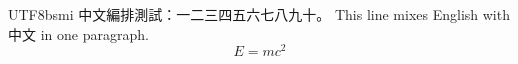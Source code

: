 \documentclass[12pt,a4paper]{article}
\newcommand{\SmokeBegin}{\begin{CJK}{UTF8}{bsmi}}
\newcommand{\SmokeEnd}{\end{CJK}}
\newcommand{\SmokeBegin}{}
\newcommand{\SmokeEnd}{}
\begin{document}
\SmokeBegin
中文編排測試：一二三四五六七八九十。
This line mixes English with 中文 in one paragraph.
\begin{equation}
  E = mc^{2}
\end{equation}
\SmokeEnd
\end{document}
